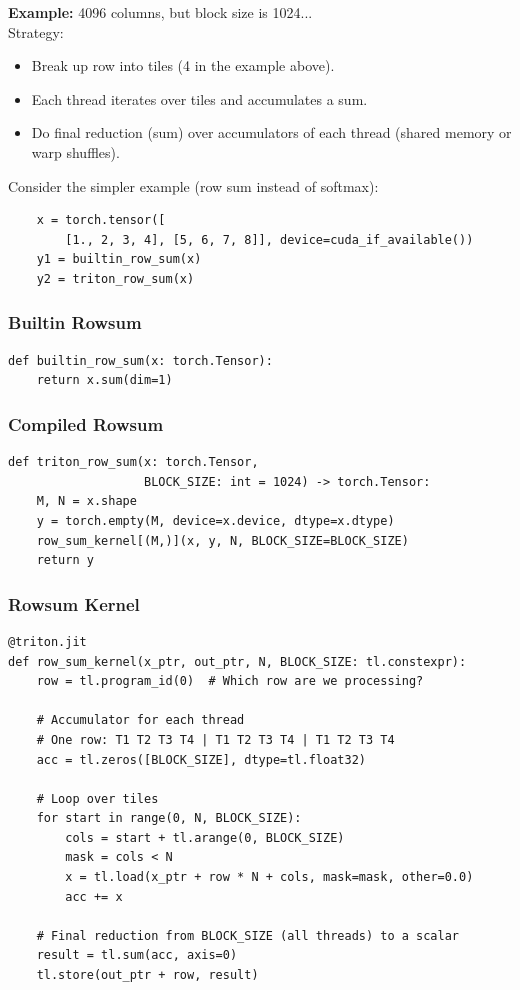 \documentclass[12pt,twoside]{article}
\begin{document}
\textbf{Example:} 4096 columns, but block size is 1024... \\

Strategy:

\begin{itemize}
    \item Break up row into tiles (4 in the example above).
    \item Each thread iterates over tiles and accumulates a sum.
    \item Do final reduction (sum) over accumulators of each thread (shared memory or warp shuffles).
\end{itemize}

Consider the simpler example (row sum instead of softmax):

\begin{verbatim}
    x = torch.tensor([
        [1., 2, 3, 4], [5, 6, 7, 8]], device=cuda_if_available())  
    y1 = builtin_row_sum(x)
    y2 = triton_row_sum(x)
\end{verbatim}

\subsubsection*{Builtin Rowsum}

\begin{verbatim}
def builtin_row_sum(x: torch.Tensor):
    return x.sum(dim=1)
\end{verbatim}

\subsubsection*{Compiled Rowsum}

\begin{verbatim}
def triton_row_sum(x: torch.Tensor, 
                   BLOCK_SIZE: int = 1024) -> torch.Tensor:
    M, N = x.shape
    y = torch.empty(M, device=x.device, dtype=x.dtype)
    row_sum_kernel[(M,)](x, y, N, BLOCK_SIZE=BLOCK_SIZE)
    return y
\end{verbatim}

\subsubsection*{Rowsum Kernel}

\begin{verbatim}
@triton.jit
def row_sum_kernel(x_ptr, out_ptr, N, BLOCK_SIZE: tl.constexpr):
    row = tl.program_id(0)  # Which row are we processing?
    
    # Accumulator for each thread
    # One row: T1 T2 T3 T4 | T1 T2 T3 T4 | T1 T2 T3 T4
    acc = tl.zeros([BLOCK_SIZE], dtype=tl.float32)
    
    # Loop over tiles
    for start in range(0, N, BLOCK_SIZE):
        cols = start + tl.arange(0, BLOCK_SIZE)
        mask = cols < N
        x = tl.load(x_ptr + row * N + cols, mask=mask, other=0.0)
        acc += x
    
    # Final reduction from BLOCK_SIZE (all threads) to a scalar
    result = tl.sum(acc, axis=0)
    tl.store(out_ptr + row, result)
\end{verbatim}
\end{document}
